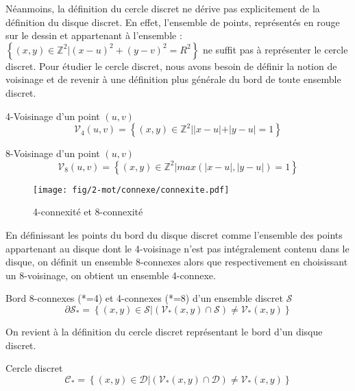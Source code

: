 Néanmoins, la définition du cercle discret ne dérive pas explicitement de la définition du disque discret. En effet, l'ensemble de points, représentés en rouge sur le dessin et appartenant à l'ensemble : $\left\{ (x,y) \in \mathbb{Z}^{2} |  (x - u)^2 + (y - v)^2 = R^2 \right\}$ ne suffit pas à représenter le cercle discret. Pour étudier le cercle discret, nous avons besoin de définir la notion de voisinage et de revenir à une définition plus générale du bord de toute ensemble discret.\\

\begin{Definition}{4-Voisinage d'un point $(u,v)$}
\label{def:vois-4}
  $$\mathcal{V}_4(u,v) =  \left\{ (x,y) \in \mathbb{Z}^{2} |  |x-u|+|y-u| = 1 \right\}$$
\end{Definition}

\begin{Definition}{8-Voisinage d'un point $(u,v)$}
\label{def:vois-8}
  $$\mathcal{V}_8(u,v) =  \left\{ (x,y) \in \mathbb{Z}^{2} |  max(|x-u|,|y-u|) = 1 \right\}$$
\end{Definition}

\begin{figure}[H]
  \centering
  \texttt{[image: fig/2-mot/connexe/connexite.pdf]}
  \caption{4-connexité et 8-connexité}
\end{figure}

En définissant les points du bord du disque discret comme l'ensemble des points appartenant au disque dont le 4-voisinage n'est pas intégralement contenu dans le disque, on définit un ensemble 8-connexes alors que respectivement en choisissant un 8-voisinage, on obtient un ensemble 4-connexe.

\begin{Definition}{Bord 8-connexes (*=4) et 4-connexes (*=8) d'un ensemble discret $\mathcal{S}$}
\label{def:bord-ens}
  $$ \partial \mathcal{S}_{*} =  \left\{ (x,y) \in \mathcal{S} | \left( \mathcal{V}_{*}(x,y) \cap \mathcal{S} \right) \neq \mathcal{V}_{*}(x,y) \right\}$$
\end{Definition}

On revient à la définition du cercle discret représentant le bord d'un disque discret.

\begin{Definition}{Cercle discret}
\label{def:cer-dis}
  $$ \mathcal{C}_{*} =  \left\{ (x,y) \in \mathcal{D} | \left( \mathcal{V}_{*}(x,y) \cap \mathcal{D} \right) \neq \mathcal{V}_{*}(x,y) \right\}$$
\end{Definition}

